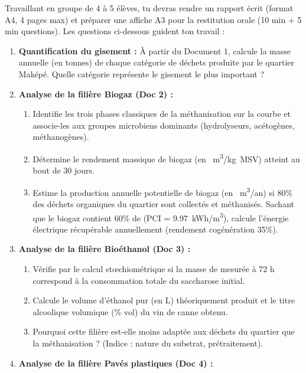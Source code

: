 \documentclass[11pt]{article}
\newcounter{popsec}
\newcounter{popsub}
\newcommand{\courssub}[1]{%
  \stepcounter{popsub}%
  \par\vspace{9pt}\noindent{\popxbold\fontsize{11.5}{13}\selectfont\color{popink}{\color{poporange}\thepopsec.\thepopsub}\hspace{6pt}#1}\par\nopagebreak\vspace{4pt}
}
\begin{document}
\courssub{Consignes}
\par
Travaillant en groupe de \num{4} à \num{5} élèves, tu devras rendre un rapport écrit (format A4, \num{4} pages max) et préparer une affiche A3 pour la restitution orale (\num{10} min + \num{5} min questions). Les questions ci-dessous guident ton travail :

\begin{enumerate}
    \item \textbf{Quantification du gisement :} À partir du Document 1, calcule la masse annuelle (en tonnes) de chaque catégorie de déchets produite par le quartier Maképé. Quelle catégorie représente le gisement le plus important ?
    \item \textbf{Analyse de la filière Biogaz (Doc 2) :}
    \begin{enumerate}
        \item Identifie les trois phases classiques de la méthanisation sur la courbe et associe-les aux groupes microbiens dominants (hydrolyseurs, acétogènes, méthanogènes).
        \item Détermine le rendement massique de biogaz (en \SI{}{m^3/kg MSV}) atteint au bout de \num{30} jours.
        \item Estime la production annuelle potentielle de biogaz (en \SI{}{m^3/an}) si \num{80}{\%} des déchets organiques du quartier sont collectés et méthanisés. Sachant que le biogaz contient \num{60}{\%} de  (PCI  = \SI{9,97}{kWh/m^3}), calcule l'énergie électrique récupérable annuellement (rendement cogénération \num{35}{\%}).
    \end{enumerate}
    \item \textbf{Analyse de la filière Bioéthanol (Doc 3) :}
    \begin{enumerate}
        \item Vérifie par le calcul stœchiométrique si la masse de  mesurée à \num{72} h correspond à la consommation totale du saccharose initial.
        \item Calcule le volume d'éthanol pur (en L) théoriquement produit et le titre alcoolique volumique (\% vol) du vin de canne obtenu.
        \item Pourquoi cette filière est-elle moins adaptée aux déchets du quartier que la méthanisation ? (Indice : nature du substrat, prétraitement).
    \end{enumerate}
    \item \textbf{Analyse de la filière Pavés plastiques (Doc 4) :}
    \begin{enumerate}

\end{enumerate}
\end{enumerate}
\end{document}
